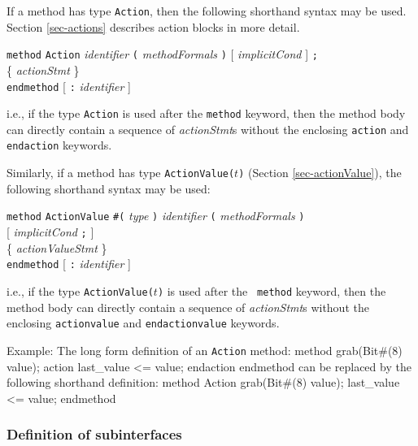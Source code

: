 \documentclass[twoside,letterpaper]{article}
\newcommand{\hm}{\hspace*{1em}}
\newcommand{\hmm}{\hspace*{2em}}
\newcommand{\hmmmm}{\hspace*{4em}}
\newenvironment{libverbatim}
  {\vspace*{-1.0em}
   \verbatim}
  {\endverbatim
  }
\newcommand{\te}[1]{\texttt{#1}}
\newcommand{\nterm}[1]{\emph{#1}}
\newcommand{\term}[1]{\texttt{#1}}
\newcommand{\many}[1]{\{ #1 \}}
\newcommand{\opt}[1]{[ #1 ]}
\newcommand{\gram}[2]{    \hm\makebox[10em][l]{\it #1}\makebox[1.5em][l]{::=}    #2}
\newcommand{\grammore}[1]{\hm\makebox[10em][l]{      }\makebox[1.5em][l]{}       #1}
\begin{document}
If a method has type \texttt{Action}, then the following shorthand syntax
may be used.  Section {\ref{sec-actions}}  describes action blocks in
more detail.

\gram{methodDef}{ \term{method} \term{Action} \nterm{identifier}
                      \term{(} \nterm{methodFormals} \term{)}
                      \opt{ \nterm{implicitCond} }
                      \term{;} } \\
\grammore{        \hmm \many{ \nterm{actionStmt} } } \\
\grammore{        \term{endmethod} \opt{ \term{:} \nterm{identifier} } }

i.e., if the type \texttt{Action} is used after the \texttt{method} keyword,
then the method body can directly contain a sequence of
\nterm{actionStmt}s
without the enclosing \te{action} and \te{endaction} keywords.

Similarly, if a method has type \texttt{ActionValue($t$)} (Section
\ref{sec-actionValue}),  the following
shorthand syntax may be used:

\gram{methodDef}{ \term{method} \term{ActionValue} \term{\#(} \nterm{type} \term{)} \nterm{identifier}
                      \term{(} \nterm{methodFormals} \term{)} } \\
\grammore       { \hmmmm   \opt{ \nterm{implicitCond} \term{;} } } \\
\grammore{        \hmm \many{ \nterm{actionValueStmt} } } \\
\grammore{        \term{endmethod} \opt{ \term{:} \nterm{identifier} } }

i.e., if the type \texttt{ActionValue($t$)} is used after the {\tt
method} keyword, then the method body can directly contain a sequence
of
\nterm{actionStmt}s
without the enclosing \te{actionvalue} and \te{endactionvalue} keywords.

Example:
The long form definition of an \te{Action} method:
\begin{libverbatim}
   method grab(Bit#(8) value);
      action
          last_value <= value;
      endaction
   endmethod
\end{libverbatim}
can be replaced by the following shorthand definition:
\begin{libverbatim}
   method Action grab(Bit#(8) value);
      last_value <= value;
   endmethod
\end{libverbatim}

\subsubsection{Definition of subinterfaces}
\end{document}
